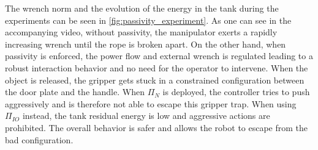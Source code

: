 The wrench norm and the evolution of the energy in the tank during the experiments can be seen in \fig \ref{fig:passivity_experiment}. As one can see in the accompanying video, without passivity, the manipulator exerts a rapidly increasing wrench until the rope is broken apart. On the other hand, when passivity is enforced, the power flow and external wrench is regulated leading to a robust interaction behavior and no need for the operator to intervene. When the object is released, the gripper gets stuck in a constrained configuration between the door plate and the handle. When $\Pi_{N}$ is deployed, the controller tries to push aggressively and is therefore not able to escape this gripper trap. When using $\Pi_{IO}$ instead, the tank residual energy is low and aggressive actions are prohibited. The overall behavior is safer and allows the robot to escape from the bad configuration.  

